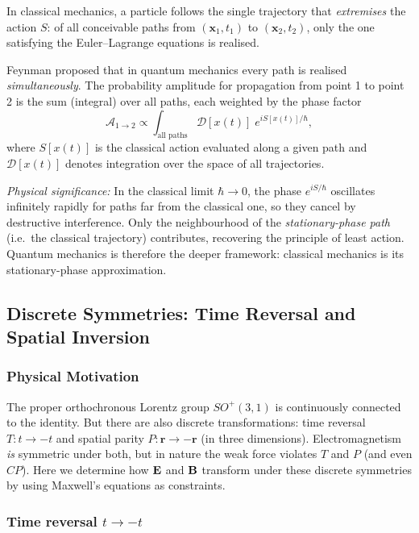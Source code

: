 In classical mechanics, a particle follows the single trajectory that \emph{extremises} the action
$S$: of all conceivable paths from $(\mathbf{x}_1,t_1)$ to $(\mathbf{x}_2,t_2)$, only the one
satisfying the Euler--Lagrange equations is realised.

Feynman proposed that in quantum mechanics every path is realised \emph{simultaneously}.  The
probability amplitude for propagation from point 1 to point 2 is the sum (integral) over all paths,
each weighted by the phase factor
\begin{equation}\label{eq:lec10:path-integral}
  \boxed{
  \mathcal{A}_{1\to 2}
  \propto
  \int_{\text{all paths}} \mathcal{D}[x(t)]\;
  e^{iS[x(t)]/\hbar} ,
  }
\end{equation}
where $S[x(t)]$ is the classical action evaluated along a given path and $\mathcal{D}[x(t)]$ denotes
integration over the space of all trajectories.

\textit{Physical significance:} In the classical limit $\hbar\to 0$, the phase $e^{iS/\hbar}$
oscillates infinitely rapidly for paths far from the classical one, so they cancel by destructive
interference.  Only the neighbourhood of the \emph{stationary-phase path} (i.e.\ the classical
trajectory) contributes, recovering the principle of least action.  Quantum mechanics is therefore
the deeper framework: classical mechanics is its stationary-phase approximation.

\subsection{Discrete Symmetries: Time Reversal and Spatial Inversion}\label{subsec:lec10-discrete}

\subsubsection*{Physical Motivation}
The proper orthochronous Lorentz group $SO^+(3,1)$ is continuously connected to the identity.  But
there are also discrete transformations: time reversal $T:t\to-t$ and spatial parity $P:\mathbf{r}\to
-\mathbf{r}$ (in three dimensions).  Electromagnetism \emph{is} symmetric under both, but in nature
the weak force violates $T$ and $P$ (and even $CP$).  Here we determine how $\mathbf{E}$ and $\mathbf{B}$ transform
under these discrete symmetries by using Maxwell's equations as constraints.

\subsubsection*{Time reversal $t\to-t$}

